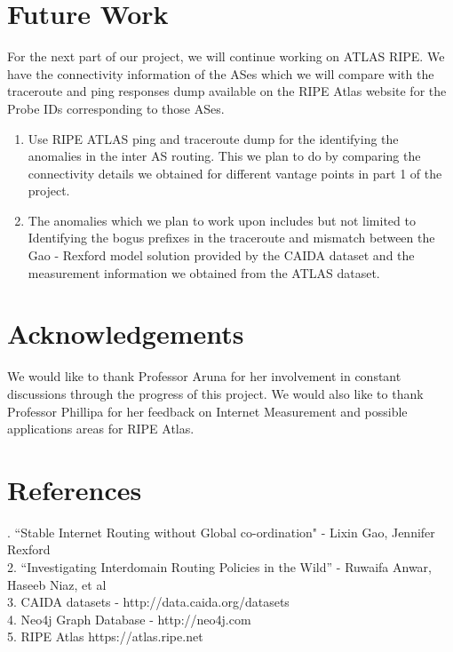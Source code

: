\documentclass{sig-alternate-05-2015}
\begin{document}
\section{Future Work}
For the next part of our project, we will continue working on ATLAS RIPE. We have the connectivity information of the ASes which we will compare with the traceroute and ping responses dump available on the RIPE Atlas website for the Probe IDs corresponding to those ASes.
\begin{enumerate}
\item Use RIPE ATLAS ping and traceroute dump for the identifying the anomalies in the inter AS routing. This we plan to do by comparing the connectivity details we obtained for different vantage points in part 1 of the project. 
\item The anomalies which we plan to work upon includes but not limited to Identifying the bogus prefixes in the traceroute and mismatch between the Gao - Rexford model solution provided by the CAIDA dataset and the measurement information we obtained from the ATLAS dataset.


\end{enumerate}

\section{Acknowledgements}
We would like to thank Professor Aruna for her involvement in constant discussions through the progress of this project. We would also like to thank Professor Phillipa for her feedback on Internet Measurement and possible applications areas for RIPE Atlas.



\section{References}
. ``Stable Internet Routing without Global co-ordination" - Lixin Gao, Jennifer Rexford\\
2. ``Investigating Interdomain Routing Policies in the Wild'' - Ruwaifa Anwar, Haseeb Niaz, et al\\
3. CAIDA datasets - http://data.caida.org/datasets \\
4. Neo4j Graph Database - http://neo4j.com\\
5. RIPE Atlas https://atlas.ripe.net\\
\end{document}
